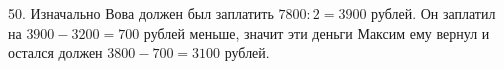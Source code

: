 50. Изначально Вова должен был заплатить $7800:2=3900$ рублей. Он заплатил на $3900-3200=700$ рублей меньше, значит эти деньги Максим ему вернул и остался должен $3800-700=3100$ рублей.\\
